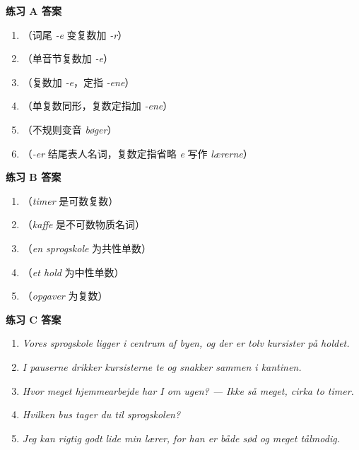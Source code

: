 \begin{answerbox}
\textbf{练习 A 答案}
\begin{enumerate}
  \item {}（词尾 \textit{-e} 变复数加 \textit{-r}）
  \item {}（单音节复数加 \textit{-e}）
  \item {}（复数加 \textit{-e}，定指 \textit{-ene}）
  \item {}（单复数同形，复数定指加 \textit{-ene}）
  \item {}（不规则变音 \textit{bøger}）
  \item {}（\textit{-er} 结尾表人名词，复数定指省略 \textit{e} 写作 \textit{lærerne}）
\end{enumerate}

\textbf{练习 B 答案}
\begin{enumerate}
  \item {}（\textit{timer} 是可数复数）
  \item {}（\textit{kaffe} 是不可数物质名词）
  \item {}（\textit{en sprogskole} 为共性单数）
  \item {}（\textit{et hold} 为中性单数）
  \item {}（\textit{opgaver} 为复数）
\end{enumerate}

\textbf{练习 C 答案}
\begin{enumerate}
  \item \textit{Vores sprogskole ligger i centrum af byen, og der er tolv kursister på holdet.}
  \item \textit{I pauserne drikker kursisterne te og snakker sammen i kantinen.}
  \item \textit{Hvor meget hjemmearbejde har I om ugen? --- Ikke så meget, cirka to timer.}
  \item \textit{Hvilken bus tager du til sprogskolen?}
  \item \textit{Jeg kan rigtig godt lide min lærer, for han er både sød og meget tålmodig.}
\end{enumerate}


\end{answerbox}
